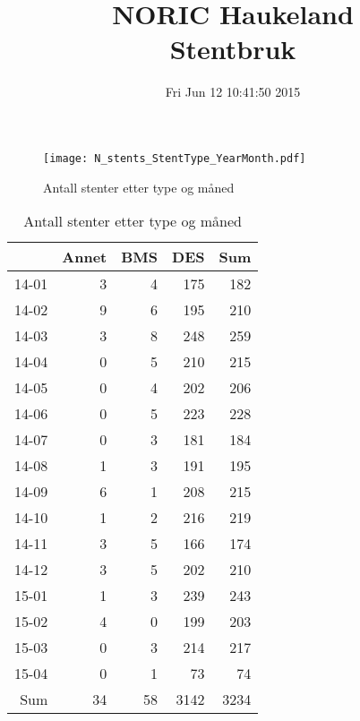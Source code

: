 \documentclass[presentation,xcolor=pdftex,dvipsnames,table]{beamer}
\title{NORIC Haukeland \\Stentbruk}\date{ Fri Jun 12 10:41:50 2015 }
\begin{document}
\maketitle



\begin{frame}
\begin{figure}
  \centering
  \caption{Antall stenter etter type og måned}
  

\texttt{[image: N\_stents\_StentType\_YearMonth.pdf]}
\end{figure}
\end{frame}



\begin{frame}
\begin{tiny}
\begin{table}[ht]
\centering
\begin{tabular}{rrrrr}
  \toprule
 & Annet & BMS & DES & Sum \\ 
  \midrule
14-01 & 3 & 4 & 175 & 182 \\ 
  14-02 & 9 & 6 & 195 & 210 \\ 
  14-03 & 3 & 8 & 248 & 259 \\ 
  14-04 & 0 & 5 & 210 & 215 \\ 
  14-05 & 0 & 4 & 202 & 206 \\ 
  14-06 & 0 & 5 & 223 & 228 \\ 
  14-07 & 0 & 3 & 181 & 184 \\ 
  14-08 & 1 & 3 & 191 & 195 \\ 
  14-09 & 6 & 1 & 208 & 215 \\ 
  14-10 & 1 & 2 & 216 & 219 \\ 
  14-11 & 3 & 5 & 166 & 174 \\ 
  14-12 & 3 & 5 & 202 & 210 \\ 
  15-01 & 1 & 3 & 239 & 243 \\ 
  15-02 & 4 & 0 & 199 & 203 \\ 
  15-03 & 0 & 3 & 214 & 217 \\ 
  15-04 & 0 & 1 & 73 & 74 \\ 
  Sum & 34 & 58 & 3142 & 3234 \\ 
   \bottomrule
\end{tabular}
\caption{Antall stenter etter type og måned} 
\end{table}\end{tiny}
\end{frame}
\end{document}
